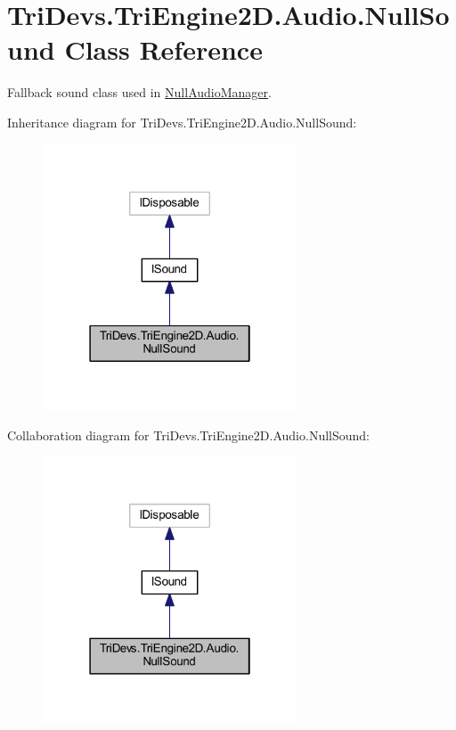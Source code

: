 \hypertarget{class_tri_devs_1_1_tri_engine2_d_1_1_audio_1_1_null_sound}{\section{Tri\-Devs.\-Tri\-Engine2\-D.\-Audio.\-Null\-Sound Class Reference}
\label{class_tri_devs_1_1_tri_engine2_d_1_1_audio_1_1_null_sound}
}


Fallback sound class used in \hyperlink{class_tri_devs_1_1_tri_engine2_d_1_1_audio_1_1_null_audio_manager}{Null\-Audio\-Manager}.  




Inheritance diagram for Tri\-Devs.\-Tri\-Engine2\-D.\-Audio.\-Null\-Sound\-:\nopagebreak
\begin{figure}[H]
\begin{center}
\leavevmode
\includegraphics[width=214pt]{class_tri_devs_1_1_tri_engine2_d_1_1_audio_1_1_null_sound__inherit__graph}
\end{center}
\end{figure}


Collaboration diagram for Tri\-Devs.\-Tri\-Engine2\-D.\-Audio.\-Null\-Sound\-:\nopagebreak
\begin{figure}[H]
\begin{center}
\leavevmode
\includegraphics[width=214pt]{class_tri_devs_1_1_tri_engine2_d_1_1_audio_1_1_null_sound__coll__graph}
\end{center}
\end{figure}
